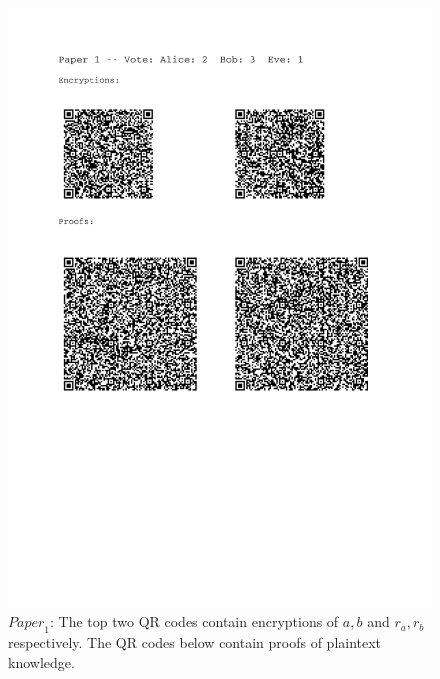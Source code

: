 \documentclass[12pt,a4paper]{article}
\theoremstyle{definition}
\newcommand{\Paper}{\mathit{Paper}}
\begin{document}
\begin{figure}
	\centering
	\includegraphics[scale=0.6, trim=2.5cm 10cm 3.1cm 0cm, clip=true]{paper1.pdf}
	\caption{$\Paper_1$: The top two QR codes contain encryptions of $a, b$ and $r_a, r_b$ respectively. The QR codes below contain proofs of plaintext knowledge.}
	\label{fig:prototype-paper1}
\end{figure}
\end{document}
